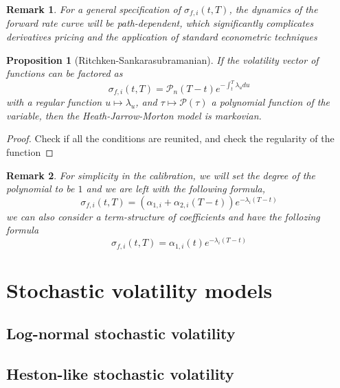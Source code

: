 \documentclass{article}
\newtheorem{proposition}[theorem]{Proposition}
\newtheorem{remark}{Remark}[section]
\begin{document}
\begin{remark}
	For a general specification of $\sigma_{f,i} (t, T )$, the dynamics of the forward rate
curve will be path-dependent, which significantly complicates derivatives pricing
and the application of standard econometric techniques
\end{remark}

\begin{proposition}[Ritchken-Sankarasubramanian]
	If the volatility vector of functions can be factored as 
	\begin{equation}
		\sigma_{f,i}(t,T) = \mathcal{P}_n(T-t) e^{-\int_t^T \lambda_u du}
	\end{equation}
	with a regular function $u \mapsto \lambda_u$, and $\tau \mapsto \mathcal{P}(\tau)$ a polynomial function of the variable, then the Heath-Jarrow-Morton model is markovian.
\end{proposition}

\begin{proof}
	Check if all the conditions are reunited, and check the regularity of the function
\end{proof}

\begin{remark}	
	For simplicity in the calibration, we will set the degree of the polynomial to be $1$ and we are left with the following formula, 
	\begin{equation}
		\sigma_{f,i}(t,T) = \left(\alpha_{1,i} + \alpha_{2,i} (T-t) \right) e^{-\lambda_i (T-t)}
	\end{equation}
	we can also consider a term-structure of coefficients and have the follozing formula
	\begin{equation}
		\sigma_{f,i}(t,T) = \alpha_{1,i}(t) e^{-\lambda_i (T-t)}
	\end{equation}
\end{remark}

\section{Stochastic volatility models}
\subsection{Log-normal stochastic volatility}

\subsection{Heston-like stochastic volatility}
\end{document}
